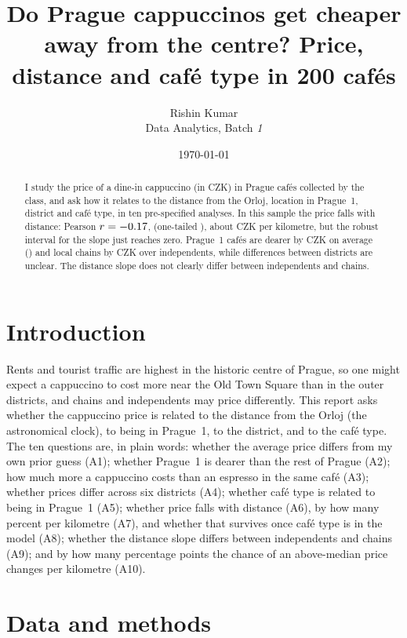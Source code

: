 \documentclass[11pt,a4paper]{article}
\title{\textbf{Do Prague cappuccinos get cheaper away from the centre? Price, distance and caf\'e type in 200 caf\'es}}
\author{Rishin Kumar\\[0.3ex]\small Data Analytics, Batch \textit{1}}
\date{\today}
\begin{document}
\maketitle

\begin{abstract}
\noindent I study the price of a dine-in cappuccino (in CZK) in \Nall{} Prague caf\'es collected by the class, and ask how it relates to the distance from the Orloj, location in Prague~1, district and caf\'e type, in ten pre-specified analyses. In this sample the price falls with distance: Pearson $r = -0.17$, \CI{\AsixRLo}{\AsixRHi} (one-tailed \AsixP), about \AsevenB{} CZK per kilometre, but the robust interval for the slope just reaches zero. Prague~1 caf\'es are dearer by \AtwoDiff{} CZK on average (\AtwoP) and local chains by \AeightLocal{} CZK over independents, while differences between districts are unclear. The distance slope does not clearly differ between independents and chains.
\end{abstract}

\section{Introduction}
Rents and tourist traffic are highest in the historic centre of Prague, so one might expect a cappuccino to cost more near the Old Town Square than in the outer districts, and chains and independents may price differently. This report asks whether the cappuccino price is related to the distance from the Orloj (the astronomical clock), to being in Prague~1, to the district, and to the caf\'e type. The ten questions are, in plain words: whether the average price differs from my own prior guess (A1); whether Prague~1 is dearer than the rest of Prague (A2); how much more a cappuccino costs than an espresso in the same caf\'e (A3); whether prices differ across six districts (A4); whether caf\'e type is related to being in Prague~1 (A5); whether price falls with distance (A6), by how many percent per kilometre (A7), and whether that survives once caf\'e type is in the model (A8); whether the distance slope differs between independents and chains (A9); and by how many percentage points the chance of an above-median price changes per kilometre (A10).

\section{Data and methods}
\end{document}

